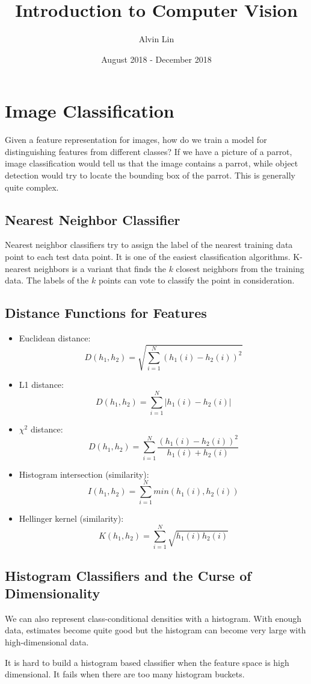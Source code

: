 \documentclass{math}
\title{Introduction to Computer Vision}
\author{Alvin Lin}
\date{August 2018 - December 2018}
\begin{document}
\maketitle

\section*{Image Classification}
Given a feature representation for images, how do we train a model for
distinguishing features from different classes? If we have a picture of a
parrot, image classification would tell us that the image contains a parrot,
while object detection would try to locate the bounding box of the parrot.
This is generally quite complex.

\subsection*{Nearest Neighbor Classifier}
Nearest neighbor classifiers try to assign the label of the nearest training
data point to each test data point. It is one of the easiest classification
algorithms. K-nearest neighbors is a variant that finds the \( k \) closest
neighbors from the training data. The labels of the \( k \) points can vote
to classify the point in consideration.

\subsection*{Distance Functions for Features}
\begin{itemize}
  \item Euclidean distance:
  \[ D(h_1,h_2) = \sqrt{\sum_{i=1}^{N}(h_1(i)-h_2(i))^2} \]
  \item L1 distance:
  \[ D(h_1,h_2) = \sum_{i=1}^{N}\bigg|h_1(i)-h_2(i)\bigg| \]
  \item \( \chi^2 \) distance:
  \[ D(h_1,h_2) = \sum_{i=1}^{N}\frac{(h_1(i)-h_2(i))^2}{h_1(i)+h_2(i)} \]
  \item Histogram intersection (similarity):
  \[ I(h_1,h_2) = \sum_{i=1}^{N}min(h_1(i),h_2(i)) \]
  \item Hellinger kernel (similarity):
  \[ K(h_1,h_2) = \sum_{i=1}^{N}\sqrt{h_1(i)h_2(i)} \]
\end{itemize}

\subsection*{Histogram Classifiers and the Curse of Dimensionality}
We can also represent class-conditional densities with a histogram. With enough
data, estimates become quite good but the histogram can become very large with
high-dimensional data. \par
It is hard to build a histogram based classifier when the feature space is
high dimensional. It fails when there are too many histogram buckets.
\end{document}
